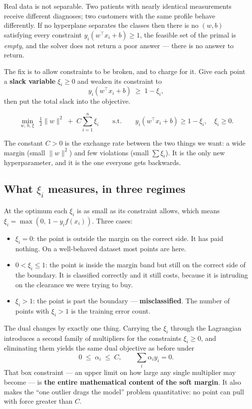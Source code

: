 \documentclass[11pt]{article}
\begin{document}
Real data is not separable. Two patients with nearly identical measurements
receive different diagnoses; two customers with the same profile behave
differently. If no hyperplane separates the classes then there is no $(w,b)$
satisfying every constraint $y_i(w^\top x_i + b) \ge 1$, the feasible set of
the primal is \emph{empty}, and the solver does not return a poor answer ---
there is no answer to return.

The fix is to allow constraints to be broken, and to charge for it. Give each
point a \textbf{slack variable} $\xi_i \ge 0$ and weaken its constraint to
\[
  y_i(w^\top x_i + b) \;\ge\; 1 - \xi_i ,
\]
then put the total slack into the objective.

\begin{keyidea}
\[
  \min_{w,\,b,\,\xi}\ \ \tfrac12\|w\|^2 \;+\; C\sum_{i=1}^{n}\xi_i
  \qquad\text{s.t.}\qquad
  y_i(w^\top x_i + b) \ge 1 - \xi_i,\quad \xi_i \ge 0 .
\]
\end{keyidea}

The constant $C > 0$ is the exchange rate between the two things we want: a
wide margin (small $\|w\|^2$) and few violations (small $\sum \xi_i$). It is
the only new hyperparameter, and it is the one everyone gets backwards.

\subsection{What $\xi_i$ measures, in three regimes}

At the optimum each $\xi_i$ is as small as its constraint allows, which means
$\xi_i = \max(0,\, 1 - y_i f(x_i))$. Three cases:

\begin{itemize}[leftmargin=*]
  \item $\xi_i = 0$: the point is outside the margin on the correct side. It
    has paid nothing. On a well-behaved dataset most points are here.
  \item $0 < \xi_i \le 1$: the point is inside the margin band but still on the
    correct side of the boundary. It is classified correctly and it still
    costs, because it is intruding on the clearance we were trying to buy.
  \item $\xi_i > 1$: the point is past the boundary --- \textbf{misclassified}.
    The number of points with $\xi_i > 1$ is the training error count.
\end{itemize}

The dual changes by exactly one thing. Carrying the $\xi_i$ through the
Lagrangian introduces a second family of multipliers for the constraints
$\xi_i \ge 0$, and eliminating them yields the same dual objective as before
under
\begin{equation}
  0 \;\le\; \alpha_i \;\le\; C ,
  \qquad \sum_i \alpha_i y_i = 0 .
  \label{eq:boxconstraint}
\end{equation}
That box constraint --- an upper limit on how large any single multiplier may
become --- is \textbf{the entire mathematical content of the soft margin}. It
also makes the ``one outlier drags the model'' problem quantitative: no point
can pull with force greater than $C$.
\end{document}
